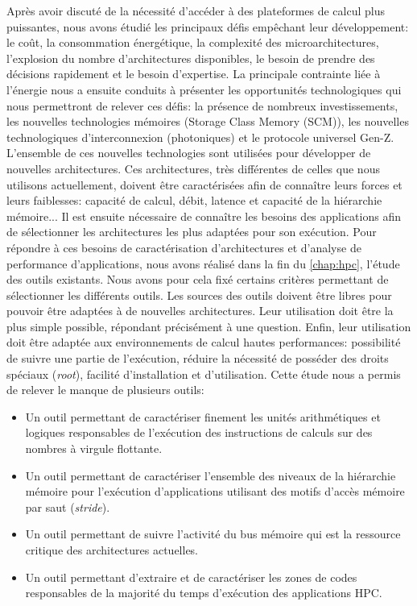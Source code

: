         Après avoir discuté de la nécessité d'accéder à des plateformes de calcul plus puissantes, nous avons étudié les principaux défis empêchant leur développement: le coût, la consommation énergétique, la complexité des microarchitectures, l'explosion du nombre d'architectures disponibles, le besoin de prendre des décisions rapidement et le besoin d'expertise. 
        La principale contrainte liée à l'énergie nous a ensuite conduits à présenter les opportunités technologiques qui nous permettront de relever ces défis: la présence de nombreux investissements, les nouvelles technologies mémoires (Storage Class Memory (SCM)), les nouvelles technologiques d'interconnexion (photoniques) et le protocole universel Gen-Z.
        L'ensemble de ces nouvelles technologies sont utilisées pour développer de nouvelles architectures. Ces architectures, très différentes de celles que nous utilisons actuellement, doivent être caractérisées afin de connaître leurs forces et leurs faiblesses: capacité de calcul, débit, latence et capacité de la hiérarchie mémoire... Il est ensuite nécessaire de connaître les besoins des applications afin de sélectionner les architectures les plus adaptées pour son exécution. Pour répondre à ces besoins de caractérisation d'architectures et d'analyse de performance d'applications, nous avons réalisé dans la fin du \autoref{chap:hpc}, l'étude des outils existants. Nous avons pour cela fixé certains critères permettant de sélectionner les différents outils. Les sources des outils doivent être libres pour pouvoir être adaptées à de nouvelles architectures. Leur utilisation doit être la plus simple possible, répondant précisément à une question. Enfin, leur utilisation doit être adaptée aux environnements de calcul hautes performances: possibilité de suivre une partie de l'exécution, réduire la nécessité de posséder des droits spéciaux (\textit{root}), facilité d'installation et d'utilisation. Cette étude nous a permis de relever le manque de plusieurs outils:
        \begin{itemize}
            \item Un outil permettant de caractériser finement les unités arithmétiques et logiques responsables de l'exécution des instructions de calculs sur des nombres à virgule flottante. 
            \item Un outil permettant de caractériser l'ensemble des niveaux de la hiérarchie mémoire pour l'exécution d'applications utilisant des motifs d'accès mémoire par saut (\textit{stride}).
            \item Un outil permettant de suivre l'activité du bus mémoire qui est la ressource critique des architectures actuelles.
            \item Un outil permettant d'extraire et de caractériser les zones de codes responsables de la majorité du temps d'exécution des applications HPC.
        \end{itemize}
      

